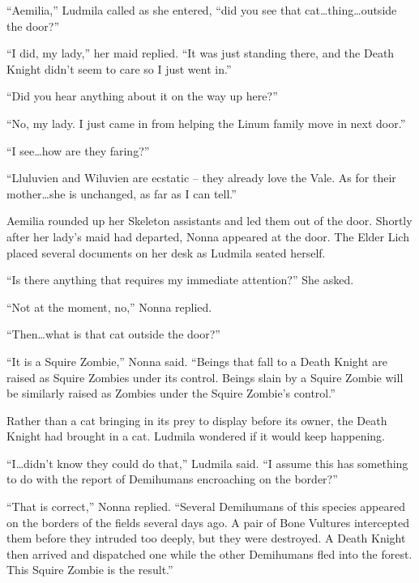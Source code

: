  

“Aemilia,” Ludmila called as she entered, “did you see that cat…thing…outside the door?”

 

“I did, my lady,” her maid replied. “It was just standing there, and the Death Knight didn’t seem to care so I just went in.”

 

“Did you hear anything about it on the way up here?”

 

“No, my lady. I just came in from helping the Linum family move in next door.”

 

“I see…how are they faring?”

 

“Lluluvien and Wiluvien are ecstatic – they already love the Vale. As for their mother…she is unchanged, as far as I can tell.”

 

Aemilia rounded up her Skeleton assistants and led them out of the door. Shortly after her lady’s maid had departed, Nonna appeared at the door. The Elder Lich placed several documents on her desk as Ludmila seated herself.

 

“Is there anything that requires my immediate attention?” She asked.

 

“Not at the moment, no,” Nonna replied.

 

“Then…what is that cat outside the door?”

 

“It is a Squire Zombie,” Nonna said. “Beings that fall to a Death Knight are raised as Squire Zombies under its control. Beings slain by a Squire Zombie will be similarly raised as Zombies under the Squire Zombie’s control.”

 

Rather than a cat bringing in its prey to display before its owner, the Death Knight had brought in a cat. Ludmila wondered if it would keep happening.

 

“I…didn’t know they could do that,” Ludmila said. “I assume this has something to do with the report of Demihumans encroaching on the border?”

 

“That is correct,” Nonna replied. “Several Demihumans of this species appeared on the borders of the fields several days ago. A pair of Bone Vultures intercepted them before they intruded too deeply, but they were destroyed. A Death Knight then arrived and dispatched one while the other Demihumans fled into the forest. This Squire Zombie is the result.”

